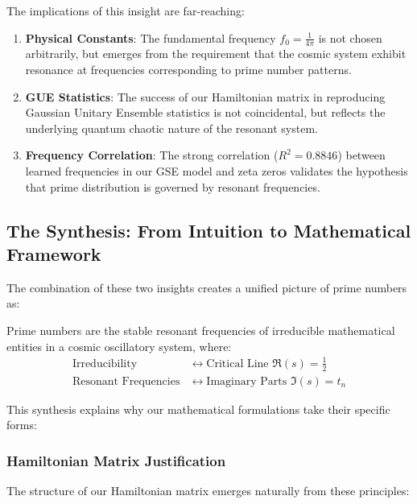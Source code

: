 The implications of this insight are far-reaching:

\begin{enumerate}
\item \textbf{Physical Constants}: The fundamental frequency $f_0 = \frac{1}{4\pi}$ is not chosen arbitrarily, but emerges from the requirement that the cosmic system exhibit resonance at frequencies corresponding to prime number patterns.

\item \textbf{GUE Statistics}: The success of our Hamiltonian matrix in reproducing Gaussian Unitary Ensemble statistics is not coincidental, but reflects the underlying quantum chaotic nature of the resonant system.

\item \textbf{Frequency Correlation}: The strong correlation ($R^2 = 0.8846$) between learned frequencies in our GSE model and zeta zeros validates the hypothesis that prime distribution is governed by resonant frequencies.
\end{enumerate}

\subsection{The Synthesis: From Intuition to Mathematical Framework}

The combination of these two insights creates a unified picture of prime numbers as:

\begin{theorem}
Prime numbers are the stable resonant frequencies of irreducible mathematical entities in a cosmic oscillatory system, where:
\begin{align}
\text{Irreducibility} &\leftrightarrow \text{Critical Line } \Re(s) = \frac{1}{2} \\
\text{Resonant Frequencies} &\leftrightarrow \text{Imaginary Parts } \Im(s) = t_n
\end{align}
\end{theorem}

This synthesis explains why our mathematical formulations take their specific forms:

\subsubsection{Hamiltonian Matrix Justification}

The structure of our Hamiltonian matrix emerges naturally from these principles:

